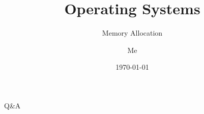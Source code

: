 \documentclass[12pt]{beamer}
\title{Operating Systems}
\subtitle{Memory Allocation}
\author{Me}
\date{\today}
\begin{document}
  \begin{frame}
    \titlepage
  \end{frame}

  
  
  

  \begin{frame}
  \begin{center}
  \Huge Q\&A
  \end{center}
  \end{frame}
\end{document}
